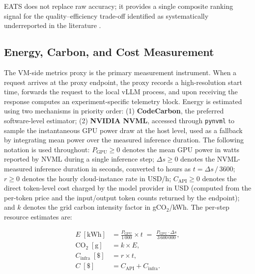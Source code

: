 EATS does not replace raw accuracy; it provides a single composite ranking signal for the quality--efficiency trade-off identified as systematically underreported in the literature \cite{slrmanuscript2026, energytoken2025}.

\subsection{Energy, Carbon, and Cost Measurement}
\label{sec:energy}

The VM-side metrics proxy is the primary measurement instrument. When a request arrives at the proxy endpoint, the proxy records a high-resolution start time, forwards the request to the local vLLM process, and upon receiving the response computes an experiment-specific telemetry block. Energy is estimated using two mechanisms in priority order: (1) \textbf{CodeCarbon}, the preferred software-level estimator; (2) \textbf{NVIDIA NVML}, accessed through \texttt{pynvml} to sample the instantaneous GPU power draw at the host level, used as a fallback by integrating mean power over the measured inference duration. The following notation is used throughout: $P_{\text{GPU}} \geq 0$ denotes the mean GPU power in watts reported by NVML during a single inference step; $\Delta s \geq 0$ denotes the NVML-measured inference duration in seconds, converted to hours as $t = \Delta s\,/\,3600$; $r \geq 0$ denotes the hourly cloud-instance rate in USD/h; $C_{\text{API}} \geq 0$ denotes the direct token-level cost charged by the model provider in USD (computed from the per-token price and the input/output token counts returned by the endpoint); and $k$ denotes the grid carbon intensity factor in gCO$_2$/kWh. The per-step resource estimates are:

\begin{align}
    E \;[\text{kWh}]            &= \frac{P_{\text{GPU}}}{1\,000} \times t
                                  \;=\; \frac{P_{\text{GPU}} \cdot \Delta s}{3\,600\,000},     \label{eq:energy} \\[4pt]
    \text{CO}_2 \;[\text{g}]    &= k \times E,                                                \label{eq:co2}    \\[4pt]
    C_{\text{infra}} \;[\$]     &= r \times t,                                                \label{eq:infra}  \\[4pt]
    C \;[\$]                    &= C_{\text{API}} + C_{\text{infra}}.                         \label{eq:cost}
\end{align}

